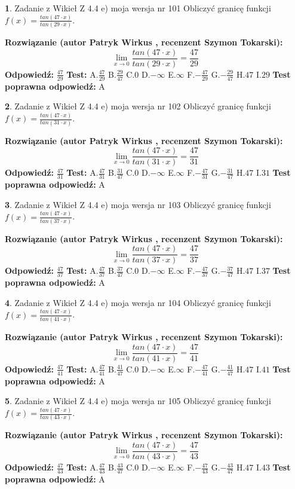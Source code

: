 \documentclass[12pt, a4paper]{article}
\theoremstyle{definition} %
\newtheorem{zad}{}
\newcommand{\zadStart}[1]{\begin{zad}#1\newline}
\newcommand{\zadStop}{\end{zad}}
\newcommand{\rozwStart}[2]{\noindent \textbf{Rozwiązanie (autor #1 , recenzent #2): }\newline}
\newcommand{\rozwStop}{\newline}
\newcommand{\odpStart}{\noindent \textbf{Odpowiedź:}\newline}
\newcommand{\odpStop}{\newline}
\newcommand{\testStart}{\noindent \textbf{Test:}\newline}
\newcommand{\testStop}{\newline}
\newcommand{\kluczStart}{\noindent \textbf{Test poprawna odpowiedź:}\newline}
\newcommand{\kluczStop}{\newline}
\begin{document}
\zadStart{Zadanie z Wikieł Z 4.4 e) moja wersja nr 101}
Obliczyć granicę funkcji $f(x)=\frac{tan(47\cdot x)}{tan(29\cdot x)}$.
\zadStop
\rozwStart{Patryk Wirkus}{Szymon Tokarski}
$$\lim\limits_{x\to 0}\frac{tan(47\cdot x)}{tan(29\cdot x)}=
\frac{47}{29}$$
\rozwStop
\odpStart
$\frac{47}{29}$
\odpStop
\testStart
A.$\frac{47}{29}$
B.$\frac{29}{47}$
C.$0$
D.$-\infty$
E.$\infty$
F.$-\frac{47}{29}$
G.$-\frac{29}{47}$
H.$47$
I.$29$
\testStop
\kluczStart
A
\kluczStop



\zadStart{Zadanie z Wikieł Z 4.4 e) moja wersja nr 102}
Obliczyć granicę funkcji $f(x)=\frac{tan(47\cdot x)}{tan(31\cdot x)}$.
\zadStop
\rozwStart{Patryk Wirkus}{Szymon Tokarski}
$$\lim\limits_{x\to 0}\frac{tan(47\cdot x)}{tan(31\cdot x)}=
\frac{47}{31}$$
\rozwStop
\odpStart
$\frac{47}{31}$
\odpStop
\testStart
A.$\frac{47}{31}$
B.$\frac{31}{47}$
C.$0$
D.$-\infty$
E.$\infty$
F.$-\frac{47}{31}$
G.$-\frac{31}{47}$
H.$47$
I.$31$
\testStop
\kluczStart
A
\kluczStop



\zadStart{Zadanie z Wikieł Z 4.4 e) moja wersja nr 103}
Obliczyć granicę funkcji $f(x)=\frac{tan(47\cdot x)}{tan(37\cdot x)}$.
\zadStop
\rozwStart{Patryk Wirkus}{Szymon Tokarski}
$$\lim\limits_{x\to 0}\frac{tan(47\cdot x)}{tan(37\cdot x)}=
\frac{47}{37}$$
\rozwStop
\odpStart
$\frac{47}{37}$
\odpStop
\testStart
A.$\frac{47}{37}$
B.$\frac{37}{47}$
C.$0$
D.$-\infty$
E.$\infty$
F.$-\frac{47}{37}$
G.$-\frac{37}{47}$
H.$47$
I.$37$
\testStop
\kluczStart
A
\kluczStop



\zadStart{Zadanie z Wikieł Z 4.4 e) moja wersja nr 104}
Obliczyć granicę funkcji $f(x)=\frac{tan(47\cdot x)}{tan(41\cdot x)}$.
\zadStop
\rozwStart{Patryk Wirkus}{Szymon Tokarski}
$$\lim\limits_{x\to 0}\frac{tan(47\cdot x)}{tan(41\cdot x)}=
\frac{47}{41}$$
\rozwStop
\odpStart
$\frac{47}{41}$
\odpStop
\testStart
A.$\frac{47}{41}$
B.$\frac{41}{47}$
C.$0$
D.$-\infty$
E.$\infty$
F.$-\frac{47}{41}$
G.$-\frac{41}{47}$
H.$47$
I.$41$
\testStop
\kluczStart
A
\kluczStop



\zadStart{Zadanie z Wikieł Z 4.4 e) moja wersja nr 105}
Obliczyć granicę funkcji $f(x)=\frac{tan(47\cdot x)}{tan(43\cdot x)}$.
\zadStop
\rozwStart{Patryk Wirkus}{Szymon Tokarski}
$$\lim\limits_{x\to 0}\frac{tan(47\cdot x)}{tan(43\cdot x)}=
\frac{47}{43}$$
\rozwStop
\odpStart
$\frac{47}{43}$
\odpStop
\testStart
A.$\frac{47}{43}$
B.$\frac{43}{47}$
C.$0$
D.$-\infty$
E.$\infty$
F.$-\frac{47}{43}$
G.$-\frac{43}{47}$
H.$47$
I.$43$
\testStop
\kluczStart
A
\kluczStop
\end{document}
